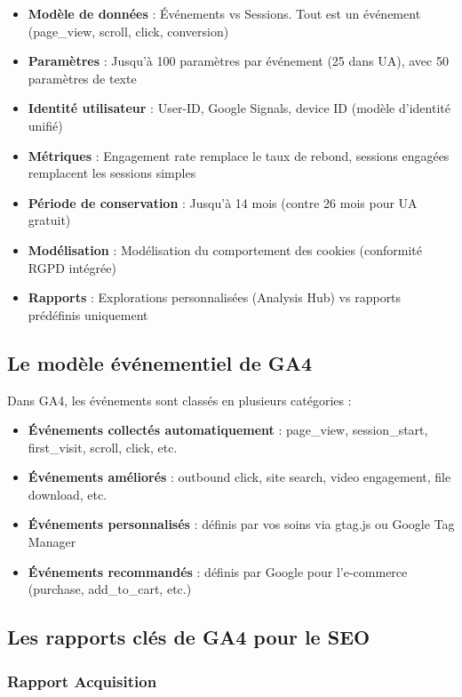 \documentclass[12pt,a4paper,twoside]{report}
\begin{document}
\begin{itemize}
    \item \textbf{Modèle de données} : Événements vs Sessions. Tout est un événement (page\_view, scroll, click, conversion)
    \item \textbf{Paramètres} : Jusqu'à 100 paramètres par événement (25 dans UA), avec 50 paramètres de texte
    \item \textbf{Identité utilisateur} : User-ID, Google Signals, device ID (modèle d'identité unifié)
    \item \textbf{Métriques} : Engagement rate remplace le taux de rebond, sessions engagées remplacent les sessions simples
    \item \textbf{Période de conservation} : Jusqu'à 14 mois (contre 26 mois pour UA gratuit)
    \item \textbf{Modélisation} : Modélisation du comportement des cookies (conformité RGPD intégrée)
    \item \textbf{Rapports} : Explorations personnalisées (Analysis Hub) vs rapports prédéfinis uniquement
\end{itemize}

\subsection{Le modèle événementiel de GA4}

Dans GA4, les événements sont classés en plusieurs catégories :
\begin{itemize}
    \item \textbf{Événements collectés automatiquement} : page\_view, session\_start, first\_visit, scroll, click, etc.
    \item \textbf{Événements améliorés} : outbound click, site search, video engagement, file download, etc.
    \item \textbf{Événements personnalisés} : définis par vos soins via gtag.js ou Google Tag Manager
    \item \textbf{Événements recommandés} : définis par Google pour l'e-commerce (purchase, add\_to\_cart, etc.)
\end{itemize}

\subsection{Les rapports clés de GA4 pour le SEO}

\subsubsection{Rapport Acquisition}
\end{document}
